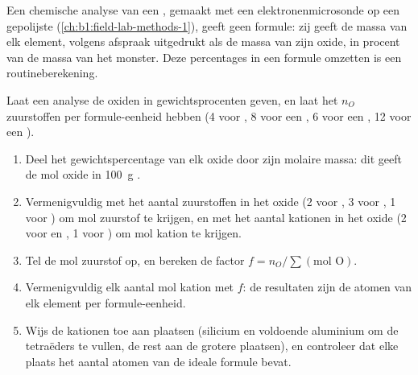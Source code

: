 Een chemische analyse van een , gemaakt met een elektronenmicrosonde op een gepolijste 
(\cref{ch:b1:field-lab-methods-1}), geeft geen formule: zij geeft de massa van elk element, volgens afspraak uitgedrukt als de
massa van zijn oxide, in procent van de massa van het monster. Deze percentages in een formule omzetten is een routineberekening.

\begin{method}\label{met:b1:rock-forming-minerals:recalculation}
Laat een analyse de oxiden in gewichtsprocenten geven, en laat het  $n_O$ zuurstoffen per formule-eenheid hebben (4 voor
, 8 voor een , 6 voor een , 12 voor een ).
\begin{enumerate}
  \item Deel het gewichtspercentage van elk oxide door zijn molaire massa: dit geeft de mol oxide in \qty{100}{g} .
  \item Vermenigvuldig met het aantal zuurstoffen in het oxide (2 voor , 3 voor , 1 voor ) om
        mol zuurstof te krijgen, en met het aantal kationen in het oxide (2 voor  en , 1 voor )
        om mol kation te krijgen.
  \item Tel de mol zuurstof op, en bereken de factor $f = n_O / \sum(\text{mol O})$.
  \item Vermenigvuldig elk aantal mol kation met $f$: de resultaten zijn de atomen van elk element per formule-eenheid.
  \item Wijs de kationen toe aan plaatsen (silicium en voldoende aluminium om de tetraëders te vullen, de rest aan de grotere
        plaatsen), en controleer dat elke plaats het aantal atomen van de ideale formule bevat.
\end{enumerate}
\end{method}

